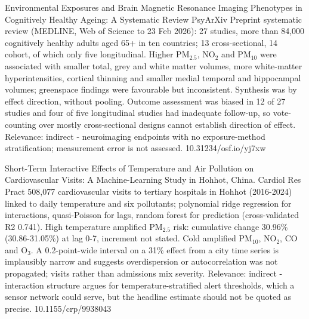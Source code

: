 \documentclass[10pt]{article}
\begin{document}
{Environmental Exposures and Brain Magnetic Resonance Imaging Phenotypes in Cognitively Healthy Ageing: A Systematic Review}
{PsyArXiv}
{Preprint systematic review (MEDLINE, Web of Science to 23 Feb 2026): 27 studies, more than 84,000 cognitively healthy adults aged 65+ in ten countries; 13 cross-sectional, 14 cohort, of which only five longitudinal. Higher PM$_{2.5}$, NO$_2$ and PM$_{10}$ were associated with smaller total, grey and white matter volumes, more white-matter hyperintensities, cortical thinning and smaller medial temporal and hippocampal volumes; greenspace findings were favourable but inconsistent. Synthesis was by effect direction, without pooling. Outcome assessment was biased in 12 of 27 studies and four of five longitudinal studies had inadequate follow-up, so vote-counting over mostly cross-sectional designs cannot establish direction of effect. Relevance: indirect - neuroimaging endpoints with no exposure-method stratification; measurement error is not assessed.}
{10.31234/osf.io/yj7xw}

\par{}\baselineskip{}\baselineskip
{}

{Short-Term Interactive Effects of Temperature and Air Pollution on Cardiovascular Visits: A Machine-Learning Study in Hohhot, China.}
{Cardiol Res Pract}
{508,077 cardiovascular visits to tertiary hospitals in Hohhot (2016-2024) linked to daily temperature and six pollutants; polynomial ridge regression for interactions, quasi-Poisson for lags, random forest for prediction (cross-validated R2 0.741). High temperature amplified PM$_{2.5}$ risk: cumulative change 30.96\% (30.86-31.05\%) at lag 0-7, increment not stated. Cold amplified PM$_{10}$, NO$_2$, CO and O$_3$. A 0.2-point-wide interval on a 31\% effect from a city time series is implausibly narrow and suggests overdispersion or autocorrelation was not propagated; visits rather than admissions mix severity. Relevance: indirect - interaction structure argues for temperature-stratified alert thresholds, which a sensor network could serve, but the headline estimate should not be quoted as precise.}
{10.1155/crp/9938043}
\end{document}
